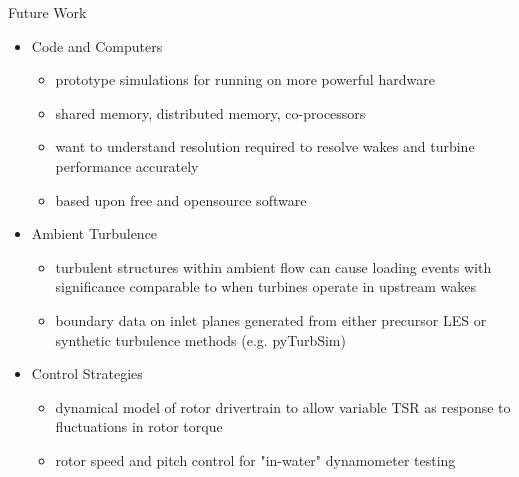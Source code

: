 \documentclass[xcolor=x11names,compress]{beamer}
\begin{document}
	\begin{frame}{Future Work}

		\begin{itemize}
			\item \footnotesize Code and Computers
				\begin{itemize}
					\item \footnotesize prototype simulations for running on more powerful hardware
					\item shared memory, distributed memory, co-processors
					\item want to understand resolution required to resolve wakes and turbine performance accurately
					\item based upon free and opensource software					
				\end{itemize}

			\item \footnotesize Ambient Turbulence
				\begin{itemize}
					\item \footnotesize turbulent structures within ambient flow can cause loading events with significance comparable to when turbines operate in upstream wakes
					\item boundary data on inlet planes generated from either precursor LES or synthetic turbulence methods (e.g. pyTurbSim)
				\end{itemize}

			\item \footnotesize Control Strategies
				\begin{itemize}
					\item \footnotesize dynamical model of rotor drivertrain to allow variable TSR as response to fluctuations in rotor torque
					\item rotor speed and pitch control for "in-water" dynamometer testing
				\end{itemize}
		\end{itemize}
	
	\end{frame}

\end{document}
